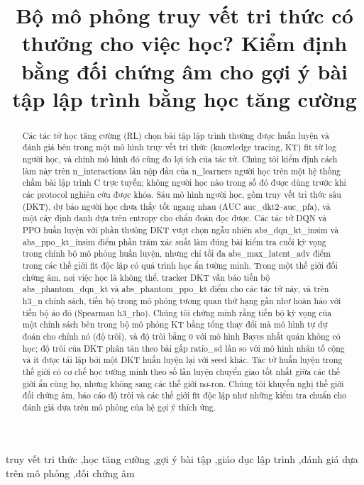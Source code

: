 \documentclass[a4paper,preprint,12pt,authoryear]{elsarticle}
\begin{document}
\begin{frontmatter}

\title{Bộ mô phỏng truy vết tri thức có thưởng cho việc học? Kiểm định bằng đối chứng âm cho gợi ý bài tập lập trình bằng học tăng cường}

\begin{abstract}
Các tác tử học tăng cường (RL) chọn bài tập lập trình thường được huấn luyện và đánh giá bên trong một mô hình truy vết tri thức (knowledge tracing, KT) fit từ log người học, và chính mô hình đó cũng đo lợi ích của tác tử. Chúng tôi kiểm định cách làm này trên {{n_interactions}} lần nộp đầu của {{n_learners}} người học trên một hệ thống chấm bài lập trình C trực tuyến; không người học nào trong số đó được dùng trước khi các protocol nghiên cứu được khóa. Sáu mô hình người học, gồm truy vết tri thức sâu (DKT), dự báo người học chưa thấy tốt ngang nhau (AUC {{auc_dkt2}}--{{auc_pfa}}), và một cây định danh dựa trên entropy cho chẩn đoán đọc được. Các tác tử DQN và PPO huấn luyện với phần thưởng DKT vượt chọn ngẫu nhiên {{abs_dqn_kt_insim}} và {{abs_ppo_kt_insim}} điểm phần trăm xác suất làm đúng bài kiểm tra cuối kỳ vọng trong chính bộ mô phỏng huấn luyện, nhưng chỉ tối đa {{abs_max_latent_adv}} điểm trong các thế giới fit độc lập có quá trình học ẩn tường minh. Trong một thế giới đối chứng âm, nơi việc học là không thể, tracker DKT vẫn báo tiến bộ {{abs_phantom_dqn_kt}} và {{abs_phantom_ppo_kt}} điểm cho các tác tử này, và trên {{h3_n}} chính sách, tiến bộ trong mô phỏng tương quan thứ hạng gần như hoàn hảo với tiến bộ ảo đó (Spearman {{h3_rho}}). Chúng tôi chứng minh rằng tiến bộ kỳ vọng của một chính sách bên trong bộ mô phỏng KT bằng tổng thay đổi mà mô hình tự dự đoán cho chính nó (độ trôi), và độ trôi bằng 0 với mô hình Bayes nhất quán không có học; độ trôi của DKT phân tán theo bài gấp {{ratio_sd}} lần so với mô hình nhân tố cộng và ít được tái lập bởi một DKT huấn luyện lại với seed khác. Tác tử huấn luyện trong thế giới có cơ chế học tường minh theo số lần luyện chuyển giao tốt nhất giữa các thế giới ẩn cùng họ, nhưng không sang các thế giới nơ-ron. Chúng tôi khuyến nghị thế giới đối chứng âm, báo cáo độ trôi và các thế giới fit độc lập như những kiểm tra chuẩn cho đánh giá dựa trên mô phỏng của hệ gợi ý thích ứng.
\end{abstract}

\begin{keyword}
truy vết tri thức \sep học tăng cường \sep gợi ý bài tập \sep giáo dục lập trình \sep đánh giá dựa trên mô phỏng \sep đối chứng âm
\end{keyword}

\end{frontmatter}
\end{document}
